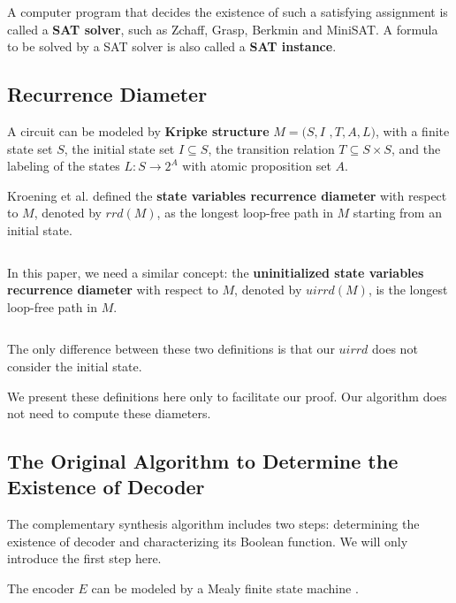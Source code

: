 \documentclass[journal]{IEEEtran}
\begin{document}
A computer program that decides the existence of such a satisfying assignment is called a \textbf{SAT solver},
such as Zchaff\cite{CHAFF}, Grasp\cite{grasp}, Berkmin\cite{BERKMIN} and MiniSAT\cite{EXTSAT}.
A formula to be solved by a SAT solver is also called a \textbf{SAT instance}.

\subsection{Recurrence Diameter}

A circuit can be modeled by \textbf{Kripke structure} $M=(S,I$ $,T,A,L)$,
with a finite state set $S$,
the initial state set $I\subseteq S$,
the transition relation $T\subseteq S\times S$,
and the labeling of the states $L:S\rightarrow 2^{A}$ with atomic proposition set $A$.

Kroening et al. \cite{RecDiam} defined the \textbf{state variables recurrence diameter} with respect to $M$,
denoted by $rrd(M)$,
as the longest loop-free path in $M$ starting from an initial state.

\begin{equation}\label{equ_svrd}
\end{equation}

In this paper,
we need a similar concept: the \textbf{uninitialized state variables recurrence diameter} with respect to $M$,
denoted by $uirrd(M)$,
is the longest loop-free path in $M$.

\begin{equation}\label{equ_uisvrd}
\end{equation}

The only difference between these two definitions is that
our $uirrd$ does not consider the initial state.

We present these definitions here only to facilitate our proof.
Our algorithm does not need to compute these diameters.

\subsection{The Original Algorithm to Determine the Existence of Decoder}\label{subsec_chkextdec}
The complementary synthesis algorithm\cite{ShengYuShen:iccad09} includes two steps:
determining the existence of decoder and characterizing its Boolean function.
We will only introduce the first step here.

The encoder $E$ can be modeled by a Mealy finite state machine \cite{MEALY}.
\end{document}
